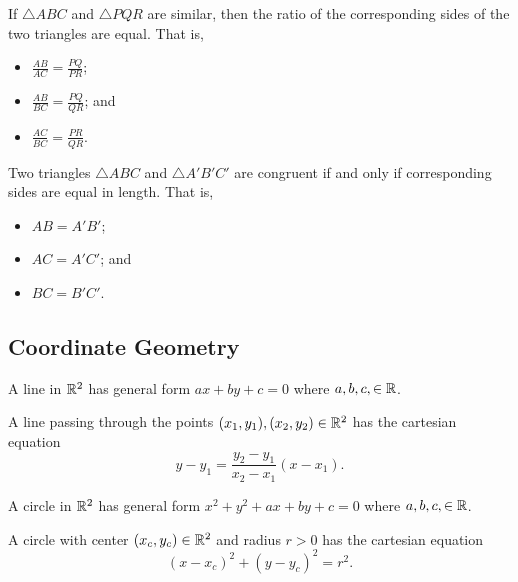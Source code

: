 \newpage

\begin{proposition}
    If $\triangle ABC$ and $\triangle PQR$ are similar, then the ratio of the corresponding sides of the two triangles are equal. That is,
    \begin{itemize}
        \item $\frac{AB}{AC} = \frac{PQ}{PR}$;
        \item $\frac{AB}{BC} = \frac{PQ}{QR}$; and
        \item $\frac{AC}{BC} = \frac{PR}{QR}$.
    \end{itemize}
\end{proposition}

\begin{definition}
    Two triangles $\triangle ABC$ and $\triangle A'B'C'$ are congruent if and only if corresponding sides are equal in length. That is,
    \begin{itemize}
        \item $AB = A'B'$;
        \item $AC = A'C'$; and
        \item $BC = B'C'$.
    \end{itemize}
\end{definition}

\subsection{Coordinate Geometry}
\begin{definition}
    A line in $\mathbb{R}^2$ has general form $ax + by + c = 0$ where $a,b,c, \in \mathbb{R}$.
\end{definition}

\begin{proposition}
    A line passing through the points $(x_1, y_1), (x_2, y_2) \in \mathbb{R}^2$ has the cartesian equation
    \[
        y - y_1 = \frac{y_2-y_1}{x_2-x_1}(x - x_1).
    \]
\end{proposition}

\begin{definition}
    A circle in $\mathbb{R}^2$ has general form $x^2 + y^2 + ax + by + c = 0$ where $a,b,c, \in \mathbb{R}$.
\end{definition}

\begin{proposition}
    A circle with center $(x_c, y_c) \in \mathbb{R}^2$ and radius $r > 0$ has the cartesian equation
    \[
        (x-x_c)^2 + (y-y_c)^2 = r^2.
    \]
\end{proposition}

